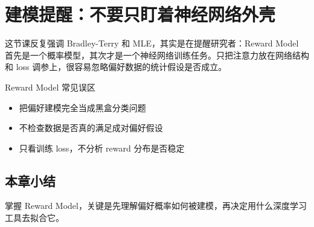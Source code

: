 \section{建模提醒：不要只盯着神经网络外壳}
这节课反复强调 Bradley-Terry 和 MLE，其实是在提醒研究者：Reward Model 首先是一个概率模型，其次才是一个神经网络训练任务。只把注意力放在网络结构和 loss 调参上，很容易忽略偏好数据的统计假设是否成立。

\begin{warningbox}{Reward Model 常见误区}
\begin{itemize}
  \item 把偏好建模完全当成黑盒分类问题
  \item 不检查数据是否真的满足成对偏好假设
  \item 只看训练 loss，不分析 reward 分布是否稳定
\end{itemize}
\end{warningbox}

\subsection{本章小结}
掌握 Reward Model，关键是先理解偏好概率如何被建模，再决定用什么深度学习工具去拟合它。

\newpage
